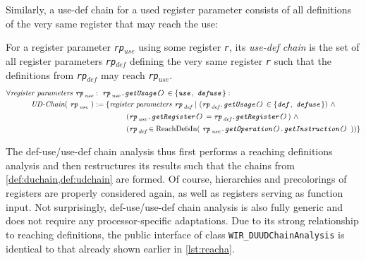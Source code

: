 Similarly, a use-def chain for a used register parameter consists of all definitions of the very same register that may reach the use:

\begin{definition} \label{def:udchain}
  For a register parameter \texttt{\emph{rp}}$_\textit{use}$ using some register \texttt{\emph r}, its \emph{use-def chain} is the set of all register parameters \texttt{\emph{rp}}$_\textit{def}$ defining the very same register \texttt{\emph r} such that the definitions from \texttt{\emph{rp}}$_\textit{def}$ may reach \texttt{\emph{rp}}$_\textit{use}$.
  \begin{align}
    \forall\text{\emph{register parameters}\ }\texttt{\emph{rp}}_\textit{use}&:\ \texttt{\emph{rp}}_\textit{use}\texttt{\emph{.getUsage()}} \in \{ \texttt{\emph{use}},\ \texttt{\emph{defuse}}\}:\nonumber \\
    \textit{UD-Chain}(\ \texttt{\emph{rp}}_\textit{use}\ ) &:= \{ \text{\emph{register parameters}\ }\texttt{\emph{rp}}_\textit{def}\ \vert\ (\texttt{\emph{rp}}_\textit{def}\texttt{\emph{.getUsage()}} \in \{ \texttt{\emph{def}},\ \texttt{\emph{defuse}}\})\ \wedge\label{eq:udchain} \\
    & \ \ \ \ \ \ \ \ \ \ \ \ \ (\texttt{\emph{rp}}_\textit{use}\texttt{\emph{.getRegister()}} = \texttt{\emph{rp}}_\textit{def}\texttt{\emph{.getRegister()}})\ \wedge\nonumber \\
    & \ \ \ \ \ \ \ \ \ \ \ \ \ (\texttt{\emph{rp}}_\textit{def} \in \text{ReachDefsIn}(\ \texttt{\emph{rp}}_\textit{use}\texttt{\emph{.getOperation().getInstruction()}}\ ))\}\nonumber
  \end{align}
\end{definition}

The def-use/use-def chain analysis thus first performs a reaching definitions analysis and then restructures its results such that the chains from \cref{def:duchain,def:udchain} are formed.
Of course, hierarchies and precolorings of registers are properly considered again, as well as registers serving as function input.
Not surprisingly, def-use/use-def chain analysis is also fully generic and does not require any processor-specific adaptations.
Due to its strong relationship to reaching definitions, the public interface of class \texttt{WIR\_DUUDChainAnalysis} is identical to that already shown earlier in \cref{lst:reacha}.

